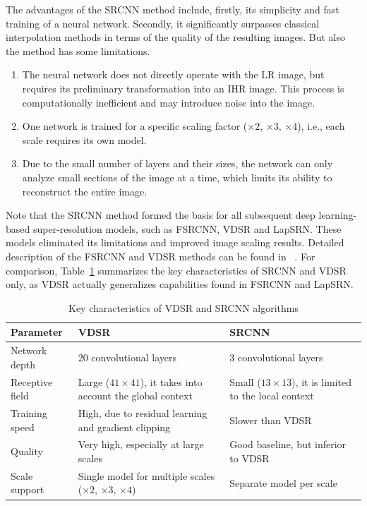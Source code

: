 \documentclass{ieeeaccess}
\begin{document}
The advantages of the SRCNN method include, firstly, its simplicity and fast training of a neural network.
Secondly, it significantly surpasses classical interpolation methods in terms of the quality of the resulting images. But also the method has some limitations.
\begin{enumerate}
    \item  The neural network does not directly operate with the LR image, but requires its preliminary transformation into an IHR image. This process is computationally inefficient and may introduce noise into the image.
     \item One network is trained for a specific scaling factor  ($\times2$, $\times3$, $\times4$), 
     i.e., each scale requires its own model.
    \item Due to the small number of layers and their sizes, the network can only analyze small sections of the image at a time, which limits its ability to reconstruct the entire image.
\end{enumerate}

Note that the SRCNN method formed the basis for all subsequent deep learning-based super-resolution models, such as FSRCNN, VDSR and LapSRN. These models eliminated  its limitations and improved image scaling results. Detailed description of the FSRCNN and VDSR methods can be found in  ~\cite{Dong_FSRCNN, Kim_VDSR}.
 For comparison, Table~\ref{tab:k1t} summarizes the key characteristics of SRCNN and VDSR only, as VDSR  actually generalizes capabilities found in FSRCNN and LapSRN.

\begin{table}[ht]
\caption{Key characteristics of VDSR and SRCNN algorithms}
\setlength{\tabcolsep}{3pt}
\begin{tabular}{|p{35pt}|p{90pt}|p{95pt}|}
\hline
Parameter & VDSR & SRCNN \\
\hline
Network depth & 20 convolutional layers & 3 convolutional layers \\
\hline
Receptive field & Large ($41\times41$), it takes into account the global context & Small ($13\times13$), it is limited to the local context \\
\hline
Training speed & High, due to residual learning and gradient clipping & Slower than VDSR \\
\hline
Quality & Very high, especially at large scales & Good baseline, but inferior to VDSR \\
\hline
Scale support & Single model for multiple scales ($\times2$, $\times3$, $\times4$) & Separate model per scale \\
\hline
\end{tabular}
\label{tab:k1t}
\end{table}
\end{document}
